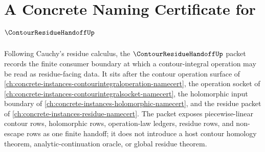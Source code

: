 \chapter{A Concrete Naming Certificate for $\ContourResidueHandoffUp$}
\label{ch:concrete-instances-contour-residue-handoff-namecert}

Following Cauchy's residue calculus, the $\ContourResidueHandoffUp$ packet records the finite consumer boundary at which a contour-integral operation may be read as residue-facing data. It sits after the contour operation surface of \autoref{ch:concrete-instances-contourintegraloperation-namecert}, the operation socket of \autoref{ch:concrete-instances-contourintegralsocket-namecert}, the holomorphic input boundary of \autoref{ch:concrete-instances-holomorphic-namecert}, and the residue packet of \autoref{ch:concrete-instances-residue-namecert}. The packet exposes piecewise-linear contour rows, holomorphic rows, operation-law ledgers, residue rows, and non-escape rows as one finite handoff; it does not introduce a host contour homology theorem, analytic-continuation oracle, or global residue theorem.

